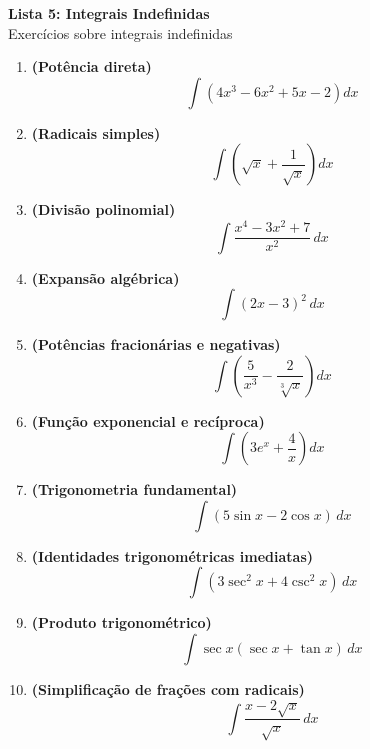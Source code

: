 \documentclass[12pt,a4paper]{article}
\begin{document}
\vspace{0.2cm}

\begin{center}
  {\LARGE\bfseries\color{primary} Lista 5: Integrais Indefinidas} \\[0.1cm]
  {\small\sffamily\color{gray} Exercícios sobre integrais indefinidas}
\end{center}




\vspace{0.4cm}

\begin{enumerate}[label=\textbf{\arabic*.}, itemsep=1.2em, leftmargin=*]
    
    \item \textbf{(Potência direta)}
    \[ \int \left( 4x^3 - 6x^2 + 5x - 2 \right) dx \]

    \item \textbf{(Radicais simples)}
    \[ \int \left( \sqrt{x} + \frac{1}{\sqrt{x}} \right) dx \]

    \item \textbf{(Divisão polinomial)}
    \[ \int \frac{x^4 - 3x^2 + 7}{x^2} \, dx \]

    \item \textbf{(Expansão algébrica)}
    \[ \int (2x - 3)^2 \, dx \]

    \item \textbf{(Potências fracionárias e negativas)}
    \[ \int \left( \frac{5}{x^3} - \frac{2}{\sqrt[3]{x}} \right) dx \]

    \item \textbf{(Função exponencial e recíproca)}
    \[ \int \left( 3e^x + \frac{4}{x} \right) dx \]

    \item \textbf{(Trigonometria fundamental)}
    \[ \int (5\sin x - 2\cos x) \, dx \]

    \item \textbf{(Identidades trigonométricas imediatas)}
    \[ \int (3\sec^2 x + 4\csc^2 x) \, dx \]

    \item \textbf{(Produto trigonométrico)}
    \[ \int \sec x (\sec x + \tan x) \, dx \]

    \item \textbf{(Simplificação de frações com radicais)}
    \[ \int \frac{x - 2\sqrt{x}}{\sqrt{x}} \, dx \]

\end{enumerate}
\end{document}
